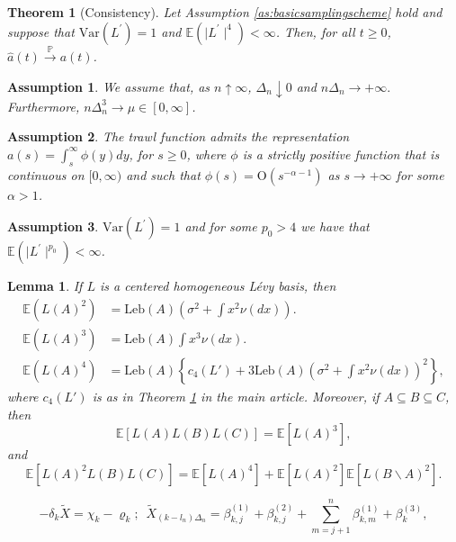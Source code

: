 \documentclass[10pt,a4paper]{amsart}
\newtheorem{assumption}{Assumption}
\newtheorem{theorem}{Theorem}
\newtheorem{lemma}{Lemma}
\newcommand{\Leb}{\ensuremath{\mathrm{Leb}}}
\newcommand{\Levy}{L\'{e}vy }
\newcommand{\Var}{\ensuremath{\mathrm{Var}}}
\begin{document}
\begin{theorem}[Consistency]\label{propconsistency}
	Let Assumption \ref{as:basicsamplingscheme} hold and suppose that $\Var(L^{\prime})=1$ and $\mathbb{E}(\mid L^{\prime}\mid^{4})<\infty$.
	Then, for all $t\geq 0$, 
	$\hat a(t) \stackrel{\mathbb{P}}{\to} a(t)$.
\end{theorem}

\begin{assumption}\label{as:samplingscheme} We assume that, as $n\uparrow\infty$,
	$\Delta_{n}\downarrow0$ and $n\Delta_{n}\rightarrow+\infty.$ Furthermore,
	$n\Delta_{n}^{3}\rightarrow\mu\in[0,\infty]$. \end{assumption}

\begin{assumption}\label{as:trawl} The trawl function admits the
	representation 
	$
	a(s)=\int_{s}^{\infty}\phi(y)dy$, for $s\geq0$, 
	where $\phi$ is a strictly positive function that is continuous on $[0,\infty)$ and such
	that $\phi(s)=\mathrm{O}(s^{-\alpha-1})$ as $s\rightarrow+\infty$
	for some $\alpha>1$.
	
\end{assumption}

\begin{assumption}\label{as:seed} $	\Var(L^{\prime})=1$
	and for some $p_{0}>4$ we have that $\mathbb{E}(\mid L^{\prime}\mid^{p_{0}})<\infty$. \end{assumption} 

\begin{lemma}\label{lemmamoments}If $L$ is a centered homogeneous
	\Levy basis, then 
	\begin{align*}
		\mathbb{E}(L(A)^{2}) & =\Leb(A)(\sigma^{2}+\int x^{2}\nu(dx)).\\
		\mathbb{E}(L(A)^{3}) & =\Leb(A)\int x^{3}\nu(dx).\\
		\mathbb{E}(L(A)^{4}) & =\Leb(A)\left\{ c_{4}(L')+3\Leb(A)(\sigma^{2}+\int x^{2}\nu(dx))^{2}\right\} ,
	\end{align*}
    where $c_{4}(L')$ is as in Theorem  \ref{propconsistency}  in the main article. Moreover, if $A\subseteq B\subseteq C$, then 
	\[
	\mathbb{E}\left[L(A)L(B)L(C)\right]=\mathbb{E}\left[L(A)^{3}\right],
	\]
	and 
	\[
	\mathbb{E}\left[L(A)^{2}L(B)L(C)\right]=\mathbb{E}\left[L(A)^{4}\right]+\mathbb{E}\left[L(A)^{2}\right]\mathbb{E}\left[L(B\backslash A)^{2}\right].
	\]
\end{lemma}

	\begin{equation}
		-\delta_{k}\tilde{X}=  \chi_{k}-\varrho_{k}; \,\,\, \tilde{X}_{(k-l_{n})\Delta_{n}}=  \beta_{k,j}^{(1)}+\beta_{k,j}^{(2)}+\sum_{m=j+1}^{n}\beta_{k,m}^{(1)}+\beta_{k}^{(3)},\label{decXbetas}
	\end{equation}
\end{document}
